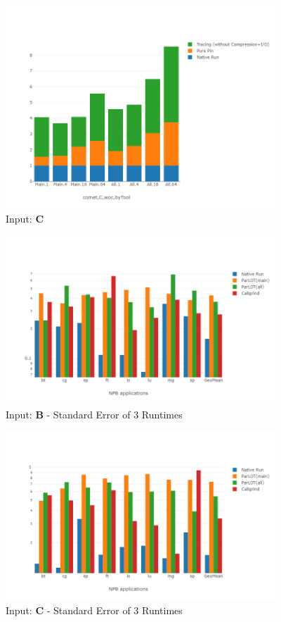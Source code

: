 \begin{figure}[!t]
\centering
\includegraphics[width=4in]{figs.comet/comet_chartDet_C_woc_byTool_p3_5.png}
\caption{ Input: \textbf{C}
}
\label{comet_chartDet_C_woc_byTool_p3_5}
\end{figure}








\begin{figure}[!t]
\centering
\includegraphics[width=4in]{figs.comet/comet_chartAvg_serr_B_p3_5.png}
\caption{ Input: \textbf{B}  - Standard Error of 3 Runtimes
}
\label{comet_chartAvg_serr_B_p3_5}
\end{figure}




\begin{figure}[!t]
\centering
\includegraphics[width=4in]{figs.comet/comet_chartAvg_serr_C_p3_5.png}
\caption{ Input: \textbf{C}  - Standard Error of 3 Runtimes
}
\label{comet_chartAvg_serr_C_p3_5}
\end{figure}





